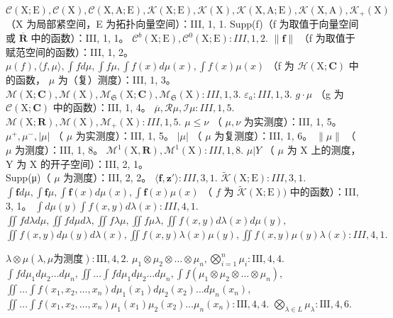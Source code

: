 \(\mathcal{C}(\mathrm{X};\mathrm{E}),\mathcal{C}(\mathrm{X}),\mathcal{C}(\mathrm{X},\mathrm{A};\mathrm{E}),\mathcal{K}(\mathrm{X};\mathrm{E}),\mathcal{K}(\mathrm{X}),\mathcal{K}(\mathrm{X},\mathrm{A};\mathrm{E}),\mathcal{K}(\mathrm{X},\mathrm{A}),\mathcal{K}_{+}(\mathrm{X})\) （X 为局部紧空间，E 为拓扑向量空间）：III, 1, 1. Supp(f)（f 为取值于向量空间或 \(\overline{\mathbf{R}}\) 中的函数）：III, 1, 1。 \(\mathcal{C}^b (\mathrm{X};\mathrm{E}),\mathcal{C}^0 (\mathrm{X};\mathrm{E}):III,1,2.\) \(\| \mathbf{f}\|\) （f 为取值于赋范空间的函数）：III, 1, 2。 \(\mu (f),\langle f,\mu \rangle ,\int fd\mu ,\int f\mu ,\int f(x)d\mu (x),\int f(x)\mu (x)\) （f 为 \(\mathcal{H}(\mathrm{X};\mathbf{C})\) 中的函数， \(\mu\) 为（复）测度）：III, 1, 3。 \(\mathcal{M}(\mathrm{X};\mathbf{C}),\mathcal{M}(\mathrm{X}),\mathcal{M}_{\mathfrak{S}}(\mathrm{X};\mathbf{C}),\mathcal{M}_{\mathfrak{S}}(\mathrm{X}):III,1,3.\) \(\varepsilon_{a}:III,1,3.\) \(g\cdot \mu\) （g 为 \(\mathcal{C}(\mathrm{X};\mathbf{C})\) 中的函数）：III, 1, 4。 \(\overline{\mu},\mathcal{R}\mu ,\mathcal{I}\mu :III,1,5.\) \(\mathcal{M}(\mathrm{X};\mathbf{R}),\mathcal{M}(\mathrm{X}),\mathcal{M}_{+}(\mathrm{X}):III,1,5.\) \(\mu \leqslant \nu\) （ \(\mu ,\nu\) 为实测度）：III, 1, 5。 \(\mu^{+},\mu^{-},|\mu |\) （ \(\mu\) 为实测度）：III, 1, 5。 \(|\mu |\) （ \(\mu\) 为复测度）：III, 1, 6。 \(\| \mu \|\) （ \(\mu\) 为测度）：III, 1, 8。 \(\mathcal{M}^1 (\mathrm{X},\mathbf{R}),\mathcal{M}^1 (\mathrm{X}):III,1,8.\) \(\mu |Y\) （ \(\mu\) 为 X 上的测度，Y 为 X 的开子空间）：III, 2, 1。\\
Supp(μ)（ \(\mu\) 为测度）：III, 2, 2。 \(\langle \mathbf{f},\mathbf{z}'\rangle :III,3,1.\) \(\widetilde{\mathcal{K}} (\mathrm{X};\mathrm{E}):III,3,1.\) \(\int \mathbf{f}d\mu ,\int \mathbf{f}\mu ,\int \mathbf{f}(x)d\mu (x),\int \mathbf{f}(x)\mu (x)\) （ \(f\) 为 \(\widetilde{\mathcal{K}} (\mathrm{X};\mathrm{E}))\) 中的函数）：III, 3, 1。 \(\int d\mu (y)\int f(x,y)d\lambda (x):III,4,1.\) \(\iint f d\lambda d\mu ,\iint f d\mu d\lambda ,\iint f\lambda \mu ,\iint f\mu \lambda ,\iint f(x,y)d\lambda (x)d\mu (y),\) \(\iint f(x,y)d\mu (y)d\lambda (x),\iint f(x,y)\lambda (x)\mu (y),\iint f(x,y)\mu (y)\lambda (x):III,4,1.\)

\(\lambda \otimes \mu (\lambda ,\mu \text{为测度}):\mathrm{III},4,2.\) \(\mu_1\otimes \mu_2\otimes \dots \otimes \mu_n,\bigotimes_{i = 1}^n\mu_i:\mathrm{III},4,4.\) \(\int f d\mu_1d\mu_2\dots d\mu_n,\iint \dots \int f d\mu_1d\mu_2\dots d\mu_n,\int f(\mu_1\otimes \mu_2\otimes \dots \otimes \mu_n),\) \(\iint \dots \int f(x_1,x_2,\ldots ,x_n)d\mu_1(x_1)d\mu_2(x_2)\dots d\mu_n(x_n),\) \(\iint \dots \int f(x_1,x_2,\ldots ,x_n)\mu_1(x_1)\mu_2(x_2)\dots \mu_n(x_n):\mathrm{III},4,4.\) \(\bigotimes_{\lambda \in L}\mu_{\lambda}:\mathrm{III},4,6.\)

